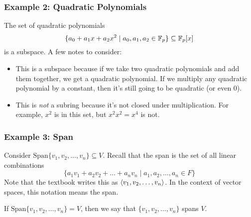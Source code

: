 \documentclass[letterpaper]{article}
\begin{document}
\subsubsection{Example 2: Quadratic Polynomials}
The set of quadratic polynomials 
\[\{a_0 + a_1 x + a_2 x^2 \mid a_0, a_1, a_2 \in \mathbb{F}_{p}\} \subseteq \mathbb{F}_{p}[x]\]
is a subspace. A few notes to consider:
\begin{itemize}
    \item This is a subspace because if we take two quadratic polynomials and add them together, we get a quadratic polynomial. If we multiply any quadratic polynomial by a constant, then it's still going to be quadratic (or even 0).
    \item This is \emph{not} a subring because it's not closed under multiplication. For example, $x^2$ is in this set, but $x^2 x^2 = x^4$ is not. 
\end{itemize}

\subsubsection{Example 3: Span}
Consider $\text{Span}\{v_1, v_2, \dots, v_n\} \subseteq V$. Recall that the span is the set of all linear combinations 
\[\{a_1 v_1 + a_2 v_2 + \dots + a_n v_n \mid a_1, a_2, \dots, a_n \in F\}\]
Note that the textbook writes this as $\langle v_1, v_2, \dots, v_n \rangle$. In the context of vector spaces, this notation means the span. 

\bigskip 

If $\text{Span}\{v_1, v_2, \dots, v_n\} = V$, then we say that $\{v_1, v_2, \dots, v_n\}$ spans $V$. 
\end{document}
